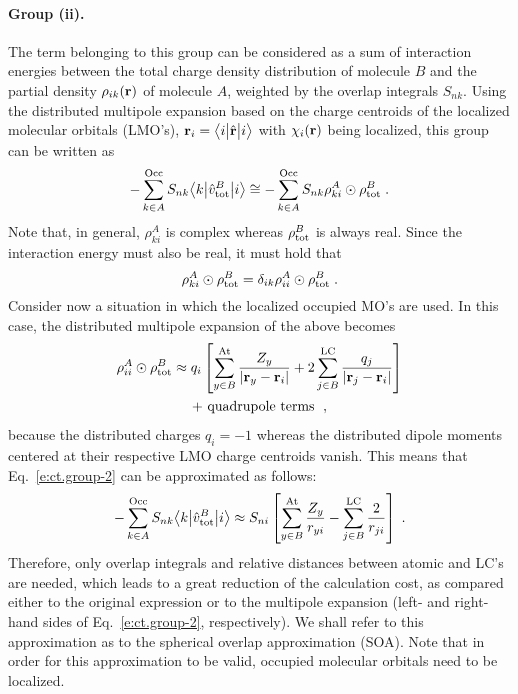 \paragraph{Group (ii).}
The term belonging to this group can be considered as a sum of interaction
energies between the total charge density distribution of molecule $B$
and the partial density $\rho_{ik}({\bf r})$ of molecule $A$,
weighted by the overlap integrals $S_{nk}$. Using the distributed multipole 
expansion based on the charge centroids of the localized molecular orbitals (LMO's),
${\bf r}_i = \bigl\langle {i} \bigl\lvert {\hat{\bf r}} \bigl\lvert {i} \bigr\rangle$ with $\chi_i({\bf r})$ being localized,
this group can be written as
%
\begin{equation} \label{e:ct.group-2}
      - \sum_{k\in A}^{\rm Occ} S_{nk}  \bigl\langle {k} \bigl\lvert {\hat{v}^B_{\rm tot} } \bigl\lvert {i} \bigr\rangle 
 \cong - \sum_{k\in A}^{\rm Occ} S_{nk} \rho_{ki}^A \odot \rho^B_{\rm tot} \;.
\end{equation}
%
Note that, in general, $\rho_{ki}^A$ is complex whereas $\rho^B_{\rm tot}$ is always real.
Since the interaction energy must also be real, it must hold that
%
\begin{equation} \label{e:ct.group-2-d}
 \rho_{ki}^A \odot \rho^B_{\rm tot} = \delta_{ik} \rho_{ii}^A \odot \rho^B_{\rm tot} \;.
\end{equation}
%
Consider now a situation in which the localized occupied MO's are used.
In this case, the distributed multipole expansion
of the above becomes
%
\begin{multline}
 \rho_{ii}^A \odot \rho^B_{\rm tot} 
 \approx 
 q_{i} 
 \left[
 \sum_{y\in B}^{\rm At}
  \frac{Z_y}{\vert {\bf r}_y - {\bf r}_i \vert } 
 +
 2\sum_{j\in B}^{\rm LC}
  \frac{q_j}{\vert {\bf r}_j - {\bf r}_i \vert } 
 \right] \\
 + \text{ quadrupole terms } \;,
\end{multline}
%
because the distributed charges
$q_i = -1$ whereas the distributed dipole moments %
centered at their
respective LMO charge centroids vanish.
This means that Eq.~\eqref{e:ct.group-2} can be approximated as follows:
%
\begin{equation} \label{e:ct.group-ii.final}
      - \sum_{k\in A}^{\rm Occ} S_{nk} \bigl\langle {k} \bigl\lvert {\hat{v}^B_{\rm tot} } \bigl\lvert {i} \bigr\rangle 
 \approx S_{ni}  \left[
 \sum_{y\in B}^{\rm At}
  \frac{Z_y}{ r_{yi} } 
 -
 \sum_{j\in B}^{\rm LC}
  \frac{2}{r_{ji}} 
 \right] \;.
\end{equation}
%
Therefore, only overlap integrals and relative distances between
atomic and LC's are needed, which leads to a great reduction of the
calculation cost,
as compared either to the original expression or to the multipole expansion (left\hyp{} and right\hyp{}hand sides
of Eq.~\eqref{e:ct.group-2}, respectively).
We shall refer to this approximation as to
the spherical overlap approximation (SOA). Note that in order for this approximation to be valid,
occupied molecular orbitals need to be localized.

